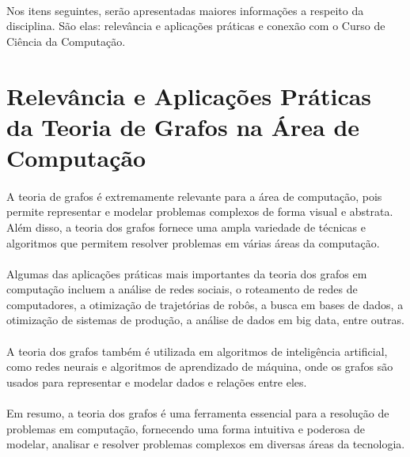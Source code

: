 \documentclass[14pt, a4paper]{article}
\begin{document}
\paragraph{}
Nos itens seguintes, serão apresentadas maiores  informações a respeito da disciplina. São elas:  relevância e aplicações práticas e conexão com o Curso de Ciência da Computação.\citep{Perfil}

\section{Relevância e Aplicações Práticas da Teoria de Grafos na Área de Computação}

\paragraph{}
A teoria de grafos é extremamente relevante para a área de computação, pois permite representar e modelar problemas complexos de forma visual e abstrata. Além disso, a teoria dos grafos fornece uma ampla variedade de técnicas e algoritmos que permitem resolver problemas em várias áreas da computação. 
\paragraph{}
Algumas das aplicações práticas mais importantes da teoria dos grafos em computação incluem a análise de redes sociais, o roteamento de redes de computadores, a otimização de trajetórias de robôs, a busca em bases de dados, a otimização de sistemas de produção, a análise de dados em big data, entre outras.
\paragraph{}
A teoria dos grafos também é utilizada em algoritmos de inteligência artificial, como redes neurais e algoritmos de aprendizado de máquina, onde os grafos são usados para representar e modelar dados e relações entre eles.
\paragraph{}
Em resumo, a teoria dos grafos é uma ferramenta essencial para a resolução de problemas em computação, fornecendo uma forma intuitiva e poderosa de modelar, analisar e resolver problemas complexos em diversas áreas da tecnologia.\citep{Grafos}




\end{document}
